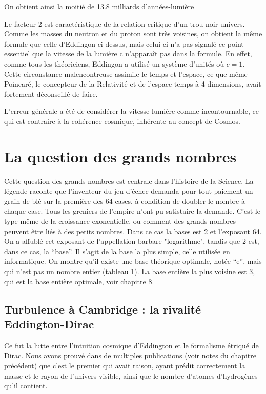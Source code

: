 \documentclass[a4paper,12pt]{article}
\begin{document}
On obtient ainsi la moitié de 13.8 milliards d'années-lumière 


Le facteur 2 est caractéristique de la relation critique d’un trou-noir-univers. Comme les masses du neutron et du proton sont très voisines, on obtient la même formule que celle d’Eddingon ci-dessus, mais celui-ci n’a pas signalé ce point essentiel que la vitesse de la lumière c n’apparaît pas dans la formule. En effet, comme tous les théoriciens, Eddingon a utilisé un système d’unités où $c = 1$. Cette circonstance malencontreuse assimile le temps et l’espace, ce que même Poincaré, le concepteur de la Relativité et de l’espace-temps à 4 dimensions, avait fortement déconseillé de faire.


L’erreur générale a été de considérer la vitesse lumière comme incontournable, ce qui est contraire à la cohérence cosmique, inhérente au concept de Cosmos.

 
 
 
 
 
 
 
 
 
\section{La question des grands nombres} 

Cette question des grands nombres est centrale dans l'histoire de la Science. La légende raconte que l'inventeur du jeu d'échec demanda pour tout paiement un grain de blé sur la première des 64 cases, à condition de doubler le nombre à chaque case. Tous les greniers de l'empire n'ont pu satistaire la demande. C'est le type m\^eme de la croissance exonentielle, ou comment des grands nombres peuvent être liés à des petits nombres. Dans ce cas la bases est 2 et l'exposant 64. On a affublé cet exposant de l'appellation barbare "logarithme", tandis que 2 est, dans ce cas, la ``base''. Il s'agit de la base la plus simple, celle utilisée en informatique. On montre qu'il existe une base théorique optimale, notée ``e'', mais qui n'est pas un nombre entier (tableau 1). La base entière la plus voisine est 3, qui est la base entière optimale, voir chapitre 8.    

\subsection{Turbulence à Cambridge : la rivalité Eddington-Dirac}
       Ce fut la lutte entre l'intuition cosmique d'Eddington et le formalisme étriqué de Dirac. Nous avons prouvé dans de multiples publications (voir notes du chapitre précédent) que c'est le premier qui avait raison, ayant prédit correctement la masse et le rayon de l'univers visible, ainsi que le nombre d'atomes d'hydrogènes qu'il contient. 
\end{document}
